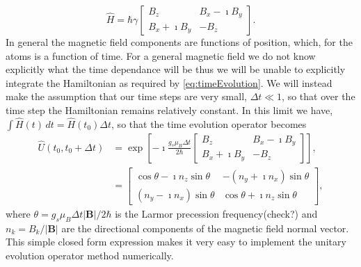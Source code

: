 \begin{equation*}
    \widehat{H} = \hbar\gamma \begin{bmatrix} B_z & B_x - \imath B_y \\
                                                      B_x + \imath B_y & -B_z \end{bmatrix}.                                         
\end{equation*}
In general the magnetic field components are functions of position, which, for the atoms is a function of time.
For a general magnetic field we do not know explicitly what the time dependance will be thus we will be unable to explicitly integrate the Hamiltonian as required by \autoref{eq:timeEvolution}.
We will instead make the assumption that our time steps are very small, $\Delta t \ll 1$, so that over the time step the Hamiltonian remains relatively constant.
In this limit we have, $\int\widehat{H}(t)\,dt = \widehat{H}(t_0)\Delta t$, so that the time evolution operator becomes
\begin{align}
    \widehat{U}(t_0,t_0+\Delta t) &= \exp\left[  -\imath\frac{g_s\mu_B\Delta t}{2 \hbar} \begin{bmatrix} B_z & B_x - \imath B_y \\
                                                      B_x + \imath B_y & -B_z \end{bmatrix} \right],\\
                &= \begin{bmatrix} \cos\theta - \imath n_z \sin\theta & -\left(n_y+\imath n_x\right)\sin\theta \\
                                   \left(n_y-\imath n_x\right)\sin\theta & \cos\theta + \imath n_z \sin\theta\end{bmatrix}, 
\end{align}
where $\theta = g_s \mu_B \Delta t \vert \mathbf{B} \vert / 2\hbar$ is the Larmor precession frequency(check?) and $n_k = B_k / \vert \mathbf{B} \vert$ are the directional components of the magnetic field normal vector.
This simple closed form expression makes it very easy to implement the unitary evolution operator method numerically.

